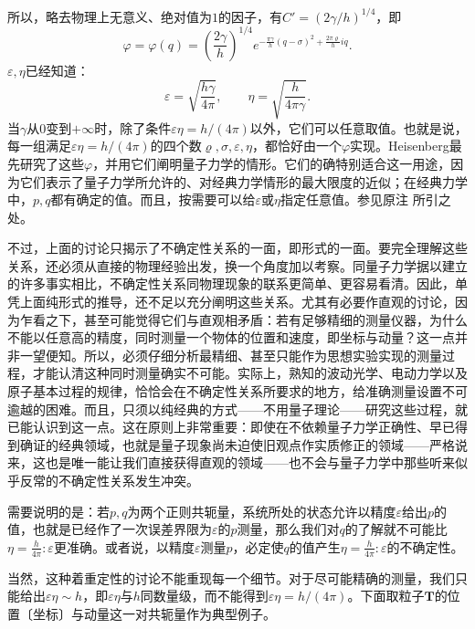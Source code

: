 \documentclass[fontsize=13pt,twoside,openany,headings=normal,parskip=false,bookmarkpackage=false,DIV=calc]{scrbook}
\begin{document}
所以，略去物理上无意义、绝对值为$1$的因子，有$C'=(2\gamma/h)^{1/4}$，即
\[
\varphi=\varphi(q)=\left(\frac{2\gamma}h\right)^{1/4}
e^{-\frac{\pi\gamma}h(q-\sigma)^2+\frac{2\pi\varrho}hiq}.
\]
$\varepsilon,\allowbreak \eta$已经知道：
\[
\varepsilon=\sqrt{\frac{h\gamma}{4\pi}},\qquad
\eta=\sqrt{\frac h{4\pi\gamma}}.
\]
当$\gamma$从$0$变到$+\infty$时，除了条件$\varepsilon\eta=h/(4\pi)$以外，它们可以任意取值。也就是说，每一组满足$\varepsilon\eta=h/(4\pi)$的四个数$\varrho,\allowbreak \sigma,\allowbreak \varepsilon,\allowbreak \eta$，都恰好由一个$\varphi$实现。Heisenberg最先研究了这些$\varphi$，并用它们阐明量子力学的情形。它们的确特别适合这一用途，因为它们表示了量子力学所允许的、对经典力学情形的最大限度的近似；在经典力学中，$p,\allowbreak q$都有确定的值。而且，按需要可以给$\varepsilon$或$\eta$指定任意值。参见原注 \hyperlink{note-131}{} 所引之处。

不过，上面的讨论只揭示了不确定性关系的一面，即形式的一面。要完全理解这些关系，还必须从直接的物理经验出发，换一个角度加以考察。同量子力学据以建立的许多事实相比，不确定性关系同物理现象的联系更简单、更容易看清。因此，单凭上面纯形式的推导，还不足以充分阐明这些关系。尤其有必要作直观的讨论，因为乍看之下，甚至可能觉得它们与直观相矛盾：若有足够精细的测量仪器，为什么不能以任意高的精度，同时测量一个物体的位置和速度，即坐标与动量？\hypertarget{origpage-126}{}\label{origpage-126}这一点并非一望便知。所以，必须仔细分析最精细、甚至只能作为思想实验实现的测量过程，才能认清这种同时测量确实不可能。实际上，熟知的波动光学、电动力学以及原子基本过程的规律，恰恰会在不确定性关系所要求的地方，给准确测量设置不可逾越的困难。而且，只须以纯经典的方式——不用量子理论——研究这些过程，就已能认识到这一点。这在原则上非常重要：即使在不依赖量子力学正确性、早已得到确证的经典领域，也就是量子现象尚未迫使旧观点作实质修正的领域——严格说来，这也是唯一能让我们直接获得直观的领域——也不会与量子力学中那些听来似乎反常的不确定性关系发生冲突。

需要说明的是：若$p,\allowbreak q$为两个正则共轭量，系统所处的状态允许以精度$\varepsilon$给出$p$的值，也就是已经作了一次误差界限为$\varepsilon$的$p$测量，那么我们对$q$的了解就不可能比$\eta=\frac h{4\pi}:\varepsilon$更准确。或者说，以精度$\varepsilon$测量$p$，必定使$q$的值产生$\eta=\frac h{4\pi}:\varepsilon$的不确定性。

当然，这种着重定性的讨论不能重现每一个细节。对于尽可能精确的测量，我们只能给出$\varepsilon\eta\sim h$，即$\varepsilon\eta$与$h$同数量级，而不能得到$\varepsilon\eta=h/(4\pi)$。下面取粒子$\boldsymbol{T}$的位置〔坐标〕与动量这一对共轭量作为典型例子。
\end{document}
